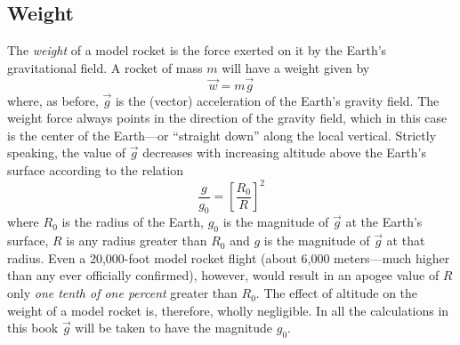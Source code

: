 \subsection{Weight}\label{ch1:sec:2.2}

The \emph{weight} of a model rocket is the force exerted on it by the Earth's
gravitational field. A rocket of mass $m$ will have a weight given by
\begin{equation}\label{ch1:eq:8}
\vec{w} = m\vec{g}
\end{equation}
where, as before, $\vec{g}$ is the (vector) acceleration of the Earth's gravity
field. The weight force always points in the direction of the gravity field,
which in this case is the center of the Earth---or ``straight down'' along the
local vertical. Strictly speaking, the value of $\vec{g}$ decreases with
increasing altitude above the Earth's surface according to the relation
\begin{equation}\label{ch1:eq:9}
\frac{g}{g_0} = \left[\frac{R_0}{R}\right]^{2}
\end{equation}
where $R_0$ is the radius of the Earth, $g_0$ is the magnitude of $\vec{g}$ at
the Earth's surface, $R$ is any radius greater than $R_0$ and $g$ is the
magnitude of $\vec{g}$ at that radius. Even a 20,000-foot model rocket flight
(about 6,000 meters---much higher than any ever officially confirmed), however,
would result in an apogee value of $R$ only \emph{one tenth of one percent}
greater than $R_0$. The effect of altitude on the weight of a model rocket is,
therefore, wholly negligible. In all the calculations in this book $\vec{g}$
will be taken to have the magnitude $g_0$.


